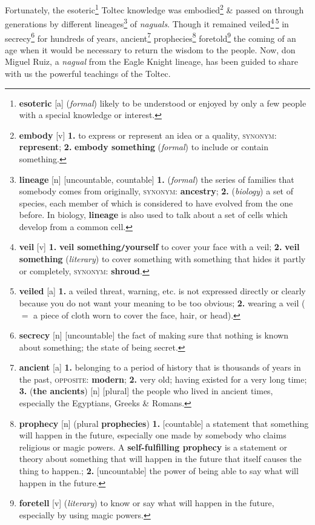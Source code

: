 \documentclass[oneside]{book}
\numberwithin{equation}{section}
\begin{document}
Fortunately, the esoteric\footnote{\textbf{esoteric} [a] (\textit{formal}) likely to be understood or enjoyed by only a few people with a special knowledge or interest.} Toltec knowledge was embodied\footnote{\textbf{embody} [v] \textbf{1.} to express or represent an idea or a quality, \textsc{synonym}: \textbf{represent}; \textbf{2.} \textbf{embody something} (\textit{formal}) to include or contain something.} \& passed on through generations by different lineages\footnote{\textbf{lineage} [n] [uncountable, countable] \textbf{1.} (\textit{formal}) the series of families that somebody comes from originally, \textsc{synonym}: \textbf{ancestry}; \textbf{2.} (\textit{biology}) a set of species, each member of which is considered to have evolved from the one before. In biology, \textbf{lineage} is also used to talk about a set of cells which develop from a common cell.} of \textit{naguals}. Though it remained veiled\footnote{\textbf{veil} [v] \textbf{1.} \textbf{veil something\texttt{/}yourself} to cover your face with a veil; \textbf{2.} \textbf{veil something} (\textit{literary}) to cover something with something that hides it partly or completely, \textsc{synonym}: \textbf{shroud}.}\,\footnote{\textbf{veiled} [a] \textbf{1.} a veiled threat, warning, etc. is not expressed directly or clearly because you do not want your meaning to be too obvious; \textbf{2.} wearing a veil ($=$ a piece of cloth worn to cover the face, hair, or head).} in secrecy\footnote{\textbf{secrecy} [n] [uncountable] the fact of making sure that nothing is known about something; the state of being secret.} for hundreds of years, ancient\footnote{\textbf{ancient} [a] \textbf{1.} belonging to a period of history that is thousands of years in the past, \textsc{opposite}: \textbf{modern}; \textbf{2.} very old; having existed for a very long time; \textbf{3.} (\textbf{the ancients}) [n] [plural] the people who lived in ancient times, especially the Egyptians, Greeks \& Romans.} prophecies\footnote{\textbf{prophecy} [n] (plural \textbf{prophecies}) \textbf{1.} [countable] a statement that something will happen in the future, especially one made by somebody who claims religious or magic powers. A \textbf{self-fulfilling prophecy} is a statement or theory about something that will happen in the future that itself causes the thing to happen.; \textbf{2.} [uncountable] the power of being able to say what will happen in the future.} foretold\footnote{\textbf{foretell} [v] (\textit{literary}) to know or say what will happen in the future, especially by using magic powers.} the coming of an age when it would be necessary to return the wisdom to the people. Now, don Miguel Ruiz, a \textit{nagual} from the Eagle Knight lineage, has been guided to share with us the powerful teachings of the Toltec.
\end{document}
